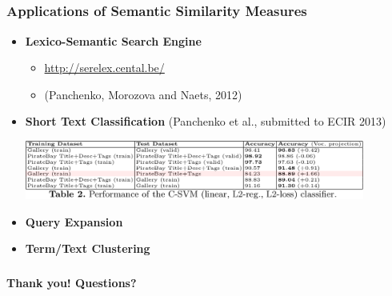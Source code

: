 \documentclass{beamer}
\begin{document}
\subsection{}
\begin{frame}
\frametitle{Applications of Semantic Similarity Measures}

\begin{itemize}
  \item \textbf{Lexico-Semantic Search Engine}
  \begin{itemize}
    \item \url{http://serelex.cental.be/}
    \item (Panchenko, Morozova and Naets, 2012)
    \end{itemize}
    
  \item \textbf{Short Text Classification} (Panchenko et al., submitted to ECIR 2013)
  
  \includegraphics[width=0.88\textwidth]{figures/stc}
  
  \item \textbf{Query Expansion} 
  
  \item \textbf{Term/Text Clustering} 
\end{itemize}
\end{frame}

\begin{frame}
\frametitle{}

\Huge \bf Thank you! Questions?
\end{frame}
\end{document}
